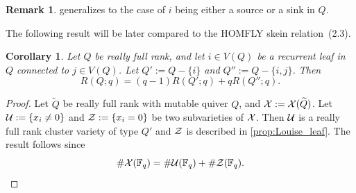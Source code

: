 \documentclass[11pt]{article}
\newtheorem{corollary}[theo]{Corollary}
\theoremstyle{definition}
\newtheorem{remark}[theo]{Remark}
\numberwithin{equation}{section}
\newcommand\Qice{\widetilde{Q}}
\def\RQ(#1){R(Q;#1)}
\def\RQX#1#2{R(#1;#2)}
\newcommand\F{\mathbb{F}}
\newcommand\XQice{\Xcal(\Qice)}
\newcommand\Louiseleaf{recurrent leaf\xspace}
\newcommand{\FLY}{HOMFLY\xspace}
\begin{document}
\begin{remark}
 generalizes to the case of $i$ being either a source or a sink in $Q$.
\end{remark}
The following result will be later compared to the \FLY skein relation~(2.3).
\begin{corollary}\label{cor:RQ_skein}
  Let $Q$ be really full rank, and let $i\in V(Q)$ be a \Louiseleaf in $Q$ connected to $j\in V(Q)$. Let $Q':=Q-\{i\}$ and $Q'':=Q-\{i,j\}$. Then
  \begin{equation}\label{eq:RQ_skein}
    \RQ(q)=(q-1)\RQX{Q'}{q} + q\RQX{Q''}{q}.
  \end{equation}
\end{corollary}
\begin{proof}
  Let $\Qice$ be really full rank with mutable quiver $Q$, and $\Xcal:=\XQice$. Let $\mathcal{U}:=\{x_i\neq0\}$ and $\mathcal{Z}:=\{x_i=0\}$ be two subvarieties of $\mathcal{X}$. Then $\mathcal{U}$ is a really full rank cluster variety of type $Q'$ and $\mathcal{Z}$ is described in \cref{prop:Louise_leaf}. The result follows since
  \begin{equation*}%
    \#\Xcal(\F_q)=\#\Ucal(\F_q) + \#\Zcal(\F_q).    \qedhere
  \end{equation*}
\end{proof}
\end{document}
